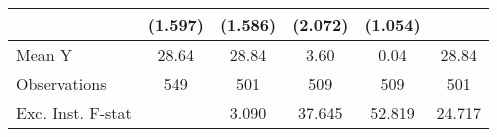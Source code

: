 {\begin{tabular}{l*{5}{c}}
            &     (1.597)         &     (1.586)         &     (2.072)         &     (1.054)         &                     \\
\midrule
Mean Y      &       28.64         &       28.84         &        3.60         &        0.04         &       28.84         \\
Observations&         549         &         501         &         509         &         509         &         501         \\
Exc. Inst. F-stat&                     &       3.090         &      37.645         &      52.819         &      24.717         \\
\bottomrule
\end{tabular}
}
